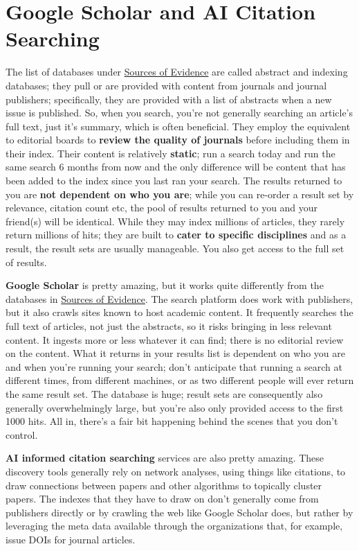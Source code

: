 \documentclass[
]{book}
\begin{document}
\section{Google Scholar and AI Citation Searching}\label{google-scholar-and-ai-citation-searching}

The list of databases under \href{}{Sources of Evidence} are called abstract and indexing databases; they pull or are provided with content from journals and journal publishers; specifically, they are provided with a list of abstracts when a new issue is published. So, when you search, you're not generally searching an article's full text, just it's summary, which is often beneficial. They employ the equivalent to editorial boards to \textbf{review the quality of journals} before including them in their index. Their content is relatively \textbf{static}; run a search today and run the same search 6 months from now and the only difference will be content that has been added to the index since you last ran your search. The results returned to you are \textbf{not dependent on who you are}; while you can re-order a result set by relevance, citation count etc, the pool of results returned to you and your friend(s) will be identical. While they may index millions of articles, they rarely return millions of hits; they are built to \textbf{cater to specific disciplines} and as a result, the result sets are usually manageable. You also get access to the full set of results.

\textbf{Google Scholar} is pretty amazing, but it works quite differently from the databases in \href{}{Sources of Evidence}. The search platform does work with publishers, but it also crawls sites known to host academic content. It frequently searches the full text of articles, not just the abstracts, so it risks bringing in less relevant content. It ingests more or less whatever it can find; there is no editorial review on the content. What it returns in your results list is dependent on who you are and when you're running your search; don't anticipate that running a search at different times, from different machines, or as two different people will ever return the same result set. The database is huge; result sets are consequently also generally overwhelmingly large, but you're also only provided access to the first 1000 hits. All in, there's a fair bit happening behind the scenes that you don't control.

\textbf{AI informed citation searching} services are also pretty amazing. These discovery tools generally rely on network analyses, using things like citations, to draw connections between papers and other algorithms to topically cluster papers. The indexes that they have to draw on don't generally come from publishers directly or by crawling the web like Google Scholar does, but rather by leveraging the meta data available through the organizations that, for example, issue DOIs for journal articles.
\end{document}
